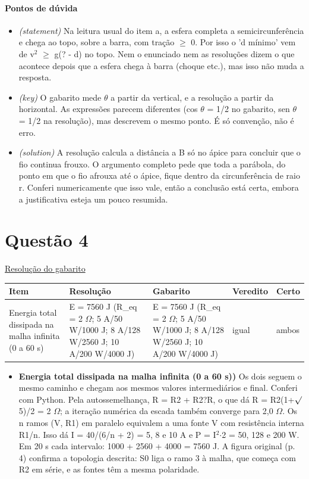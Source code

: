 \documentclass{article}%
\begin{document}
\paragraph{Pontos de dúvida}%
\begin{itemize}%
\item%
\textit{(statement)} Na leitura usual do item a, a esfera completa a semicircunferência e chega ao topo, sobre a barra, com tração $\geq$ 0. Por isso o 'd mínimo' vem de v$^2$ $\geq$ g(? - d) no topo. Nem o enunciado nem as resoluções dizem o que acontece depois que a esfera chega à barra (choque etc.), mas isso não muda a resposta.%
\item%
\textit{(key)} O gabarito mede $\theta$ a partir da vertical, e a resolução a partir da horizontal. As expressões parecem diferentes (cos $\theta$ = 1/2 no gabarito, sen $\theta$ = 1/2 na resolução), mas descrevem o mesmo ponto. É só convenção, não é erro.%
\item%
\textit{(solution)} A resolução calcula a distância a B só no ápice para concluir que o fio continua frouxo. O argumento completo pede que toda a parábola, do ponto em que o fio afrouxa até o ápice, fique dentro da circunferência de raio r. Conferi numericamente que isso vale, então a conclusão está certa, embora a justificativa esteja um pouco resumida.%
\end{itemize}%
\section*{Questão 4}%
\href{https://poliedroresolve.sistemapoliedro.com.br/vestibulares/ime/2026/ime-2-fase-dia-2-24-10-2025-2-fase-dia-2/dissertativa-4-fisica-2-fase-dia-2-ime-2026}{Resolução do gabarito}\par\smallskip%
\begin{longtable}{@{}p{} p{} p{} p{} p{}@{}}\toprule Item & Resolução & Gabarito & Veredito & Certo \\ \midrule
Energia total dissipada na malha infinita (0 a 60 s) & E = 7560 J (R\_eq = 2 $\Omega$; 5 A/50 W/1000 J; 8 A/128 W/2560 J; 10 A/200 W/4000 J) & E = 7560 J (R\_eq = 2 $\Omega$; 5 A/50 W/1000 J; 8 A/128 W/2560 J; 10 A/200 W/4000 J) & igual & ambos \\
\bottomrule\end{longtable}%
\begin{itemize}%
\item%
\textbf{Energia total dissipada na malha infinita (0 a 60 s))} Os dois seguem o mesmo caminho e chegam aos mesmos valores intermediários e final. Conferi com Python. Pela autossemelhança, R = R2 + R2?R, o que dá R = R2(1+$\surd$5)/2 = 2 $\Omega$; a iteração numérica da escada também converge para 2,0 $\Omega$. Os n ramos (V, R1) em paralelo equivalem a uma fonte V com resistência interna R1/n. Isso dá I = 40/(6/n + 2) = 5, 8 e 10 A e P = I$^2$$\cdot$2 = 50, 128 e 200 W. Em 20 s cada intervalo: 1000 + 2560 + 4000 = 7560 J. A figura original (p. 4) confirma a topologia descrita: S0 liga o ramo 3 à malha, que começa com R2 em série, e as fontes têm a mesma polaridade.%
\end{itemize}%
\end{document}

